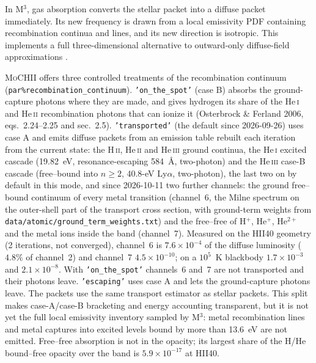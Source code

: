 \documentclass[english,a4paper]{my_memo}
\newcommand{\code}[1]{\texttt{#1}}
\newcommand{\MoCHII}{\textsc{MoCHII}}
\newcommand{\Mthree}{M$^3$}
\begin{document}
In \Mthree{}, gas absorption converts the stellar packet into a diffuse
packet immediately.  Its new frequency is drawn from a local emissivity
PDF containing recombination continua and lines, and its new direction is
isotropic.  This implements a full three-dimensional alternative to
outward-only diffuse-field approximations \cite{jin2022}.

\MoCHII{} offers three controlled treatments of the recombination continuum
(\code{par\%recombination\_continuum}).  \code{'on\_the\_spot'} (case B)
absorbs the ground-capture photons where they are made, and
gives hydrogen its share of the He\,\textsc{i} and He\,\textsc{ii}
recombination photons that can ionize it (Osterbrock \& Ferland 2006,
eqs.~2.24--2.25 and sec.~2.5).  \code{'transported'} (the default since 2026-09-26) uses case A and emits
diffuse packets from an emission table rebuilt each iteration from the
current state: the H\,\textsc{ii}, He\,\textsc{ii} and He\,\textsc{iii}
ground continua, the He\,\textsc{i} excited cascade (19.82~eV, resonance-escaping 584~\AA{},
two-photon) and the He\,\textsc{iii} case-B cascade (free--bound into
$n\ge2$, 40.8-eV Ly$\alpha$, two-photon), the last two on by default in this
mode, and since 2026-10-11 two further channels: the ground free--bound
continuum of every metal transition (channel~6, the Milne spectrum on the
outer-shell part of the transport cross section, with ground-term weights
from \code{data/\allowbreak atomic/\allowbreak ground\_term\_weights.txt}) and the free--free of
H$^+$, He$^+$, He$^{2+}$ and the metal ions inside the band (channel~7).
Measured on the HII40 geometry (2 iterations, not converged), channel~6 is
$7.6\times10^{-4}$ of the diffuse luminosity ($4.8\%$ of channel~2) and
channel~7 $4.5\times10^{-10}$; on a $10^5$~K blackbody $1.7\times10^{-3}$
and $2.1\times10^{-8}$.  With \code{'on\_the\_spot'} channels~6 and~7 are
not transported and their photons leave.  \code{'escaping'} uses case A and
lets the ground-capture photons leave.  The packets use the same transport
estimator as stellar packets.  This split makes case-A/case-B bracketing and
energy accounting transparent, but it is not yet the full local emissivity
inventory sampled by \Mthree{}: metal recombination lines and metal
captures into excited levels bound by more than 13.6~eV are not emitted.  Free--free absorption is not
in the opacity; its largest share of the H/He bound--free opacity over the
band is $5.9\times10^{-17}$ at HII40.
\end{document}
